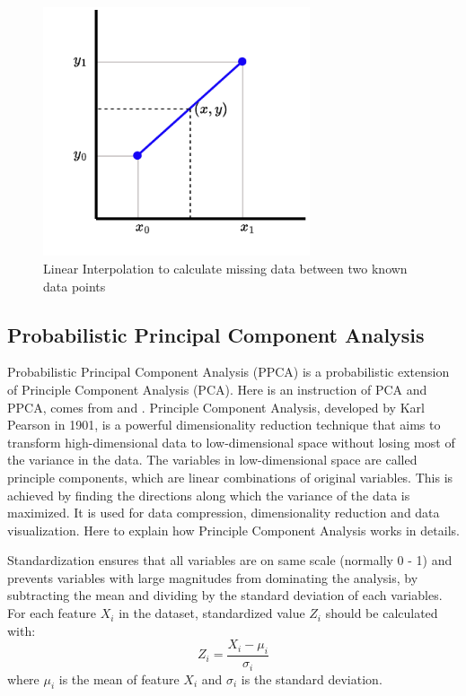 \documentclass[12pt,a4paper,english
]{tunithesis}
\begin{document}
\begin{figure}
  \begin{center}
    \includegraphics[width=0.7\textwidth]{thesis/img/linear_impute.pdf}
  \end{center}
  \caption[Linear Interpolation]{Linear Interpolation to calculate missing data between two known data points}
  \label{fig:linear_impute_fig}
\end{figure}

\subsection{Probabilistic Principal Component Analysis}
Probabilistic Principal Component Analysis (PPCA) is a probabilistic extension of Principle Component Analysis (PCA). Here is an instruction of PCA and PPCA, comes from \textcite{lindsay2002} and \textcite{tipping2002}.
Principle Component Analysis, developed by Karl Pearson in 1901, is a powerful dimensionality reduction technique that aims to transform high-dimensional data to low-dimensional space without losing most of the variance in the data. \parencite{mackiewicz1993} The variables in low-dimensional space are called principle components, which are linear combinations of original variables. This is achieved by finding the directions along which the variance of the data is maximized. It is used for data compression, dimensionality reduction and data visualization. Here to explain how Principle Component Analysis works in details.

Standardization ensures that all variables are on same scale (normally 0 - 1) and prevents variables with large magnitudes from dominating the analysis, by subtracting the mean and dividing by the standard deviation of each variables. For each feature $X_i$ in the dataset, standardized value $Z_i$ should be calculated with:
\begin{equation*}
    {Z_i} = {\frac {{X_i}-{\mu_i}}{\sigma_i}}
\end{equation*}
where $\mu_i$ is the mean of feature $X_i$ and $\sigma_i$ is the standard deviation.
\end{document}
